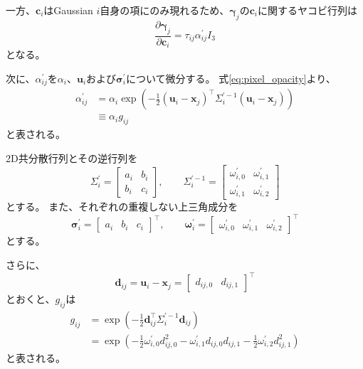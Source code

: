\documentclass[dvipdfmx]{jlreq}
\begin{document}
一方、$\bm{c}_i$はGaussian $i$自身の項にのみ現れるため、$\bm{\gamma}_j$の$\bm{c}_i$に関するヤコビ行列は
\begin{equation}
    \frac{\partial\bm{\gamma}_j}{\partial\bm{c}_i} = \tau_{ij}\alpha_{ij}^{\prime}I_3
    \label{eq:pixel_color_color_jacobian}
\end{equation}
となる。

次に、$\alpha_{ij}^{\prime}$を$\alpha_i$、$\bm{u}_i$および$\bm{\sigma}_i^{\prime}$について微分する。
式\eqref{eq:pixel_opacity}より、
\begin{equation}
    \begin{aligned}
        \alpha_{ij}^{\prime} &= \alpha_i\exp\left(-\frac{1}{2}(\bm{u}_i-\bm{x}_j)^{\top}\Sigma_i^{\prime-1}(\bm{u}_i-\bm{x}_j)\right)\\
        &\equiv \alpha_i g_{ij}
    \end{aligned}
    \label{eq:screen_opacity_backward}
\end{equation}
と表される。

2D共分散行列とその逆行列を
\begin{equation}
    \Sigma_i^{\prime} = \begin{bmatrix} a_i & b_i \\ b_i & c_i \end{bmatrix}, \qquad \Sigma_i^{\prime-1} = \begin{bmatrix} \omega_{i,0}^{\prime} & \omega_{i,1}^{\prime}\\ \omega_{i,1}^{\prime} & \omega_{i,2}^{\prime} \end{bmatrix}
    \label{eq:screen_covariance_inverse_components}
\end{equation}
とする。
また、それぞれの重複しない上三角成分を
\begin{equation}
    \bm{\sigma}_i^{\prime} = \begin{bmatrix} a_i & b_i & c_i \end{bmatrix}^{\top}, \qquad
    \bm{\omega}_i^{\prime} = \begin{bmatrix} \omega_{i,0}^{\prime} & \omega_{i,1}^{\prime} & \omega_{i,2}^{\prime} \end{bmatrix}^{\top}
    \label{eq:screen_covariance_vectors}
\end{equation}
とする。

さらに、
\begin{equation}
    \bm{d}_{ij} = \bm{u}_i-\bm{x}_j = \begin{bmatrix} d_{ij,0} & d_{ij,1} \end{bmatrix}^{\top}
    \label{eq:pixel_displacement_backward}
\end{equation}
とおくと、$g_{ij}$は
\begin{equation}
    \begin{aligned}
        g_{ij} &= \exp\left(-\frac{1}{2}\bm{d}_{ij}^{\top}\Sigma_i^{\prime-1}\bm{d}_{ij}\right)\\
        &= \exp\left(-\frac{1}{2}\omega_{i,0}^{\prime}d_{ij,0}^2-\omega_{i,1}^{\prime}d_{ij,0}d_{ij,1}-\frac{1}{2}\omega_{i,2}^{\prime}d_{ij,1}^2\right)
    \end{aligned}
    \label{eq:gaussian_weight_backward}
\end{equation}
と表される。
\end{document}

